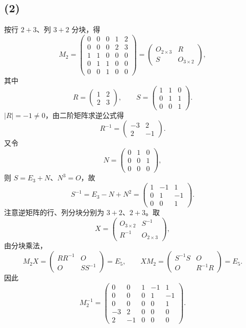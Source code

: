 \documentclass[11pt,a4paper,fontset=fandol]{ctexart}
\newcommand{\ans}[1]{\boxed{#1}}
\begin{document}
\subsection*{(2)}
按行 $2+3$、列 $3+2$ 分块，得
\[
M_2=\left(\begin{array}{ccc|cc}
0&0&0&1&2\\
0&0&0&2&3\\ \hline
1&1&0&0&0\\
0&1&1&0&0\\
0&0&1&0&0
\end{array}\right)
=\begin{pmatrix}O_{2\times3}&R\\S&O_{3\times2}\end{pmatrix},
\]
其中
\[
R=\begin{pmatrix}1&2\\2&3\end{pmatrix},\qquad
S=\begin{pmatrix}1&1&0\\0&1&1\\0&0&1\end{pmatrix}.
\]
$|R|=-1\ne0$，由二阶矩阵求逆公式得
\[
R^{-1}=\begin{pmatrix}-3&2\\2&-1\end{pmatrix}.
\]
又令
\[
N=\begin{pmatrix}0&1&0\\0&0&1\\0&0&0\end{pmatrix},
\]
则 $S=E_3+N$、$N^3=O$，故
\[
S^{-1}=E_3-N+N^2
=\begin{pmatrix}1&-1&1\\0&1&-1\\0&0&1\end{pmatrix}.
\]
注意逆矩阵的行、列分块分别为 $3+2$、$2+3$。取
\[
X=\begin{pmatrix}O_{3\times2}&S^{-1}\\R^{-1}&O_{2\times3}\end{pmatrix},
\]
由分块乘法，
\[
M_2X=\begin{pmatrix}RR^{-1}&O\\O&SS^{-1}\end{pmatrix}=E_5,
\qquad
XM_2=\begin{pmatrix}S^{-1}S&O\\O&R^{-1}R\end{pmatrix}=E_5.
\]
因此
\[
\ans{M_2^{-1}=
\begin{pmatrix}
0&0&1&-1&1\\
0&0&0&1&-1\\
0&0&0&0&1\\
-3&2&0&0&0\\
2&-1&0&0&0
\end{pmatrix}}.
\]
\end{document}
